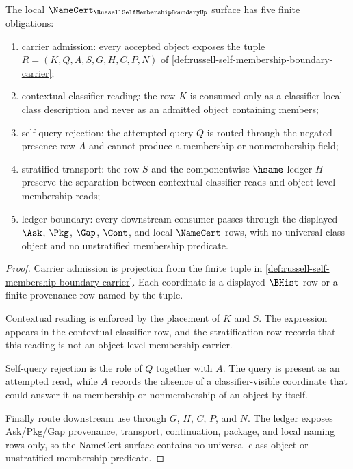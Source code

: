 \begin{theorem}
\label{thm:russell-self-membership-boundary-namecert-obligations}
The local $\NameCert_{\RussellSelfMembershipBoundaryUp}$ surface has five finite obligations:
\begin{enumerate}
\item carrier admission: every accepted object exposes the tuple $R=(K,Q,A,S,G,H,C,P,N)$ of \autoref{def:russell-self-membership-boundary-carrier};
\item contextual classifier reading: the row $K$ is consumed only as a classifier-local class description and never as an admitted object containing members;
\item self-query rejection: the attempted query $Q$ is routed through the negated-presence row $A$ and cannot produce a membership or nonmembership field;
\item stratified transport: the row $S$ and the componentwise $\hsame$ ledger $H$ preserve the separation between contextual classifier reads and object-level membership reads;
\item ledger boundary: every downstream consumer passes through the displayed $\Ask$, $\Pkg$, $\Gap$, $\Cont$, and local $\NameCert$ rows, with no universal class object and no unstratified membership predicate.
\end{enumerate}
\end{theorem}
\begin{proof}
Carrier admission is projection from the finite tuple in \autoref{def:russell-self-membership-boundary-carrier}. Each coordinate is a displayed $\BHist$ row or a finite provenance row named by the tuple.

Contextual reading is enforced by the placement of $K$ and $S$. The expression appears in the contextual classifier row, and the stratification row records that this reading is not an object-level membership carrier.

Self-query rejection is the role of $Q$ together with $A$. The query is present as an attempted read, while $A$ records the absence of a classifier-visible coordinate that could answer it as membership or nonmembership of an object by itself.

Finally route downstream use through $G$, $H$, $C$, $P$, and $N$. The ledger exposes Ask/Pkg/Gap provenance, transport, continuation, package, and local naming rows only, so the NameCert surface contains no universal class object or unstratified membership predicate.
\end{proof}


